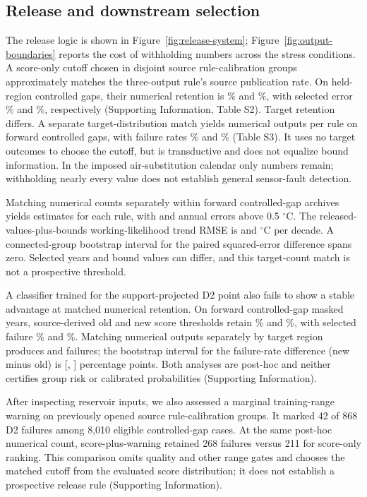 \documentclass[draft,linenumbers]{agujournal2025}
\begin{document}
\subsection{Release and downstream selection}
The release logic is shown in Figure~\ref{fig:release-system}; Figure~\ref{fig:output-boundaries} reports the cost of withholding numbers across the stress conditions. A score-only cutoff chosen in disjoint source rule-calibration groups approximately matches the three-output rule's source publication rate. On held-region controlled gaps, their numerical retention is \SRCGapThreeRetention\% and \SRCGapScoreRetention\%, with selected error \SRCGapThreeRisk\% and \SRCGapScoreRisk\%, respectively (Supporting Information, Table S2). Target retention differs. A separate target-distribution match yields \MRFutureCount{} numerical outputs per rule on forward controlled gaps, with failure rates \MRFutureThree\% and \MRFutureScore\% (Table S3). It uses no target outcomes to choose the cutoff, but is transductive and does not equalize bound information. In the imposed air-substitution calendar only \MRAirCount{} numbers remain; withholding nearly every value does not establish general sensor-fault detection.

Matching numerical counts separately within \AMCases{} forward controlled-gap archives yields \AMNumerical{} estimates for each rule, with \AMBadOriginal{} and \AMBadScore{} annual errors above 0.5 $^{\circ}$C. The released-values-plus-bounds working-likelihood trend RMSE is \AMOriginalRMSE{} and \AMScoreRMSE{} $^{\circ}$C per decade. A connected-group bootstrap interval for the paired squared-error difference spans zero. Selected years and bound values can differ, and this target-count match is not a prospective threshold.

A classifier trained for the support-projected D2 point also fails to show a stable advantage at matched numerical retention. On \PRCases{} forward controlled-gap masked years, source-derived old and new score thresholds retain \PROldRetention\% and \PRNewRetention\%, with selected failure \PROldFailure\% and \PRNewFailure\%. Matching \PRMatchedCount{} numerical outputs separately by target region produces \PRMatchedOldBad{} and \PRMatchedNewBad{} failures; the bootstrap interval for the failure-rate difference (new minus old) is [\PRMatchedLow, \PRMatchedHigh] percentage points. Both analyses are post-hoc and neither certifies group risk or calibrated probabilities (Supporting Information).

After inspecting reservoir inputs, we also assessed a marginal training-range warning on previously opened source rule-calibration groups. It marked 42 of 868 D2 failures among 8,010 eligible controlled-gap cases. At the same post-hoc numerical count, score-plus-warning retained 268 failures versus 211 for score-only ranking. This comparison omits quality and other range gates and chooses the matched cutoff from the evaluated score distribution; it does not establish a prospective release rule (Supporting Information).
\end{document}
